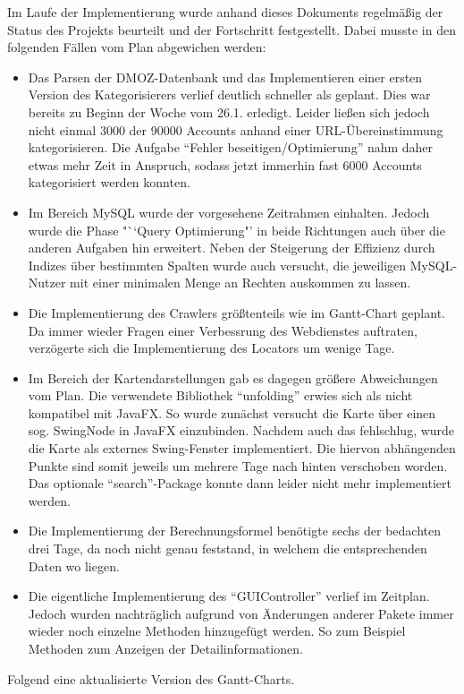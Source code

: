 Im Laufe der Implementierung wurde anhand dieses Dokuments regelmäßig der Status des Projekts beurteilt und der Fortschritt festgestellt. Dabei musste in den folgenden Fällen vom Plan abgewichen werden:
\begin{itemize}
	\item Das Parsen der DMOZ-Datenbank und das Implementieren einer ersten Version des Kategorisierers verlief deutlich schneller als geplant. Dies war bereits zu Beginn der Woche vom 26.1. erledigt. Leider ließen sich jedoch nicht einmal 3000 der 90000 Accounts anhand einer URL-Übereinstimmung kategorisieren. Die Aufgabe "`Fehler beseitigen/Optimierung"' nahm daher etwas mehr Zeit in Anspruch, sodass jetzt immerhin fast 6000 Accounts kategorisiert werden konnten.
	\item Im Bereich MySQL wurde der vorgesehene Zeitrahmen einhalten. Jedoch wurde die Phase "``Query Optimierung"' in beide Richtungen auch über die anderen Aufgaben hin erweitert. Neben der Steigerung der Effizienz durch Indizes über bestimmten Spalten wurde auch versucht, die jeweiligen MySQL-Nutzer mit einer minimalen Menge an Rechten auskommen zu lassen.
	\item Die Implementierung des Crawlers größtenteils wie im Gantt-Chart geplant. Da immer wieder Fragen einer Verbessrung des Webdienstes auftraten, verzögerte sich die Implementierung des Locators um wenige Tage.
	\item Im Bereich der Kartendarstellungen gab es dagegen größere Abweichungen vom Plan. Die verwendete Bibliothek "`unfolding"' erwies sich als nicht kompatibel mit JavaFX. So wurde zunächst versucht die Karte über einen sog. SwingNode in JavaFX einzubinden. Nachdem auch das fehlschlug, wurde die Karte als externes Swing-Fenster implementiert. Die hiervon abhängenden Punkte sind somit jeweils um mehrere Tage nach hinten verschoben worden. Das optionale "`search"'-Package konnte dann leider nicht mehr implementiert werden.
	\item Die Implementierung der Berechnungsformel benötigte sechs der bedachten drei Tage, da noch nicht genau feststand, in welchem die entsprechenden Daten wo liegen.
	\item Die eigentliche Implementierung des "`GUIController"' verlief im Zeitplan. Jedoch wurden nachträglich aufgrund von Änderungen anderer Pakete immer wieder noch einzelne Methoden hinzugefügt werden. So zum Beispiel Methoden zum Anzeigen der Detailinformationen.
\end{itemize}

Folgend eine aktualisierte Version des Gantt-Charts.


